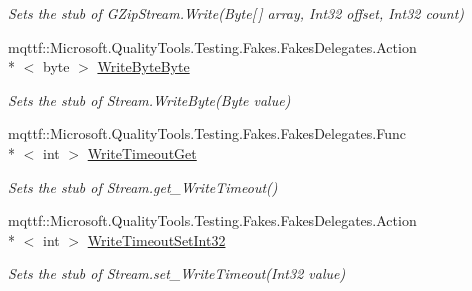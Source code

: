 \begin{DoxyCompactItemize}
\begin{DoxyCompactList}\small\item\em Sets the stub of G\-Zip\-Stream.\-Write(\-Byte\mbox{[}$\,$\mbox{]} array, Int32 offset, Int32 count)\end{DoxyCompactList}\item 
mqttf\-::\-Microsoft.\-Quality\-Tools.\-Testing.\-Fakes.\-Fakes\-Delegates.\-Action\\*
$<$ byte $>$ \hyperlink{class_system_1_1_i_o_1_1_compression_1_1_fakes_1_1_stub_g_zip_stream_abaadec7953354258ba221aeee5947c49}{Write\-Byte\-Byte}
\begin{DoxyCompactList}\small\item\em Sets the stub of Stream.\-Write\-Byte(\-Byte value)\end{DoxyCompactList}\item 
mqttf\-::\-Microsoft.\-Quality\-Tools.\-Testing.\-Fakes.\-Fakes\-Delegates.\-Func\\*
$<$ int $>$ \hyperlink{class_system_1_1_i_o_1_1_compression_1_1_fakes_1_1_stub_g_zip_stream_a7e51c58504c45dff26e9b65c2b0c7073}{Write\-Timeout\-Get}
\begin{DoxyCompactList}\small\item\em Sets the stub of Stream.\-get\-\_\-\-Write\-Timeout()\end{DoxyCompactList}\item 
mqttf\-::\-Microsoft.\-Quality\-Tools.\-Testing.\-Fakes.\-Fakes\-Delegates.\-Action\\*
$<$ int $>$ \hyperlink{class_system_1_1_i_o_1_1_compression_1_1_fakes_1_1_stub_g_zip_stream_a79b0c460894fec9791335a9ff6cfa361}{Write\-Timeout\-Set\-Int32}
\begin{DoxyCompactList}\small\item\em Sets the stub of Stream.\-set\-\_\-\-Write\-Timeout(\-Int32 value)\end{DoxyCompactList}\end{DoxyCompactItemize}
